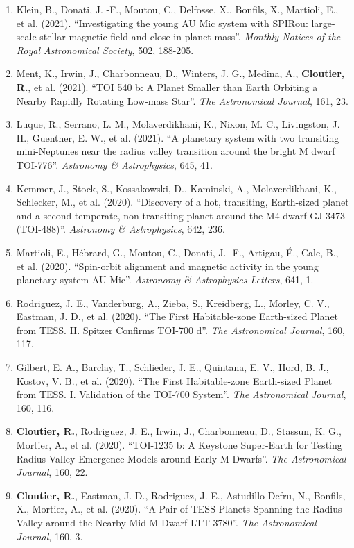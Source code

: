 \documentclass[12pt]{article}
\begin{document}
\begin{itemize}
\begin{enumerate}
\item Klein, B., Donati, J. -F., Moutou, C., Delfosse, X., Bonfils, X., Martioli, E., et al. (2021). ``Investigating the young AU Mic system with SPIRou: large-scale stellar magnetic field and close-in planet mass''. {\it Monthly Notices of the Royal Astronomical Society}, 502, 188-205.
\item Ment, K., Irwin, J., Charbonneau, D., Winters, J. G., Medina, A., {\bf Cloutier, R.}, et al. (2021). ``TOI 540 b: A Planet Smaller than Earth Orbiting a Nearby Rapidly Rotating Low-mass Star''. {\it The Astronomical Journal}, 161, 23.
\item Luque, R., Serrano, L. M., Molaverdikhani, K., Nixon, M. C., Livingston, J. H., Guenther, E. W., et al. (2021). ``A planetary system with two transiting mini-Neptunes near the radius valley transition around the bright M dwarf TOI-776''. {\it Astronomy \& Astrophysics}, 645, 41.
\item Kemmer, J., Stock, S., Kossakowski, D., Kaminski, A., Molaverdikhani, K., Schlecker, M., et al. (2020). ``Discovery of a hot, transiting, Earth-sized planet and a second temperate, non-transiting planet around the M4 dwarf GJ 3473 (TOI-488)''. {\it Astronomy \& Astrophysics}, 642, 236.
\item Martioli, E., Hébrard, G., Moutou, C., Donati, J. -F., Artigau, É., Cale, B., et al. (2020). ``Spin-orbit alignment and magnetic activity in the young planetary system AU Mic''. {\it Astronomy \& Astrophysics Letters}, 641, 1.
\item Rodriguez, J. E., Vanderburg, A., Zieba, S., Kreidberg, L., Morley, C. V., Eastman, J. D., et al. (2020). ``The First Habitable-zone Earth-sized Planet from TESS. II. Spitzer Confirms TOI-700 d''. {\it The Astronomical Journal}, 160, 117.
\item Gilbert, E. A., Barclay, T., Schlieder, J. E., Quintana, E. V., Hord, B. J., Kostov, V. B., et al. (2020). ``The First Habitable-zone Earth-sized Planet from TESS. I. Validation of the TOI-700 System''. {\it The Astronomical Journal}, 160, 116.
\item {\bf Cloutier, R.}, Rodriguez, J. E., Irwin, J., Charbonneau, D., Stassun, K. G., Mortier, A., et al. (2020). ``TOI-1235 b: A Keystone Super-Earth for Testing Radius Valley Emergence Models around Early M Dwarfs''. {\it The Astronomical Journal}, 160, 22.
\item {\bf Cloutier, R.}, Eastman, J. D., Rodriguez, J. E., Astudillo-Defru, N., Bonfils, X., Mortier, A., et al. (2020). ``A Pair of TESS Planets Spanning the Radius Valley around the Nearby Mid-M Dwarf LTT 3780''. {\it The Astronomical Journal}, 160, 3.

\end{enumerate}
\end{itemize}
\end{document}
